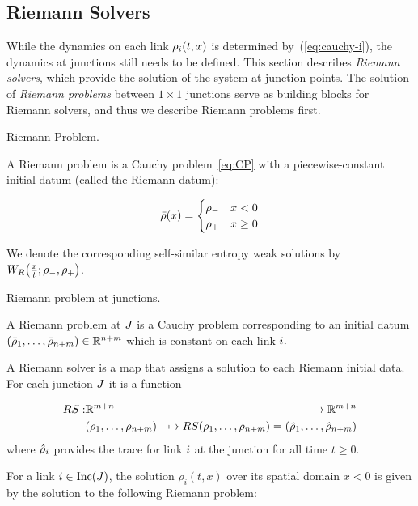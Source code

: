 \subsection{Riemann Solvers}
\label{sec:riemann-solvers}

While the dynamics on each link $\rho_{\link}\left(t,x\right)$ is
determined by~(\ref{eq:cauchy-i}), the dynamics at junctions
still needs to be defined. This section describes \emph{Riemann solvers}, which provide the solution of the system at junction points. The solution of \emph{Riemann problems} between $1 \times 1$ junctions serve as building blocks for Riemann solvers, and thus we describe Riemann problems first.

\begin{defn}
\label{def:Riemann-Problem}Riemann Problem.

A Riemann problem is a Cauchy problem~\eqref{eq:CP} with a piecewise-constant initial datum (called the Riemann datum):

\begin{equation}
\label{eqn:riemann-problem}
\bar{\rho}(x)=\begin{cases}
\rho_{-} & x<0\\
\rho_{+} & x\ge 0
\end{cases}
\end{equation}
\end{defn}
We denote the corresponding self-similar entropy weak solutions by $\ss{\frac{x}{t}}{\rho_{-}}{\rho_{+}}$.

\begin{defn}
\label{def:Riemann-Problem-Junction}
Riemann problem at junctions. 

A Riemann problem at $J$ is a Cauchy problem corresponding to an initial datum $\tuple{\initstate_{1}}{\initstate_{\ninc+\nout}}\in\mathbb{R}^{\ninc+\nout}$ which is constant on each link $i.$

\end{defn}


\begin{defn}
A Riemann solver is a map that assigns a solution to each Riemann initial data. For each junction $J$ it is a function

\begin{eqnarray*}
\RS: & \mathbb{R}^{m+n} & \rightarrow\mathbb{R}^{m+n}\\
 & \tuple{\initstate_{1}}{\initstate_{\ninc+\nout}} & \mapsto\RS\tuple{\initstate_{1}}{\initstate_{\ninc+\nout}}=\tuple{\trace{\rho}_{1}}{\trace{\rho}_{\ninc+\nout}}
\end{eqnarray*}
where $\hat{\rho}_{i}$ provides the trace for link $i$
at the junction for all time $t\ge0$.

\end{defn}
For a link $i\in\Inc\left(\jn\right)$,
the solution $\rho_{i}\left(t,x\right)$ over its spatial domain
$x<0$ is given by the solution to the following Riemann problem:

